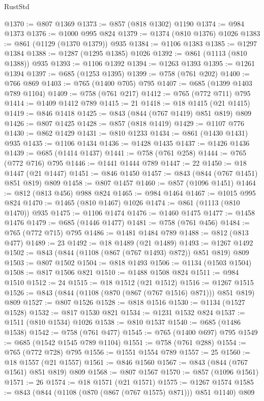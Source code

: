 \begin{lexlean}{RustStd}
\begin{coremodule}
@1370 := @807 @1369
@1373 := @857 (@818 @1302) @1190
@1374 := @984 @1373
@1376 := @1000 @995 @824
@1379 := @1374 (@810 @1376) @1026
@1383 := @861 (@1129 (@1370 @1379)) @935
@1384 := @1106 @1383
@1385 := @1297 @1384
@1388 := @1287 (@1295 @1385) @1026
@1392 := @861 (@1113 (@810 @1388)) @935
@1393 := @1106 @1392
@1394 := @1263 @1393
@1395 := @1261 @1394
@1397 := @685 (@1253 @1395)
@1399 := @758 (@761 @202)
@1400 := @766 @869
@1403 := @765 (@1400 @705) @795
@1407 := @685 (@1399 @1403 @789 @1104)
@1409 := @758 (@761 @217)
@1412 := @765 (@772 @711) @795
@1414 := @1409 @1412 @789
@1415 := 21
@1418 := @18 @1415 (@21 @1415)
@1419 := @846 @1418
@1425 := @843 (@844 (@767 @1419) @851 @819) @809
@1426 := @807 @1425
@1428 := @857 (@818 @1419)
@1429 := @1107 @776
@1430 := @862 @1429
@1431 := @810 @1233
@1434 := @861 (@1430 @1431) @935
@1435 := @1106 @1434
@1436 := @1428 @1435
@1437 := @1426 @1436
@1439 := @685 (@1414 @1437)
@1441 := @758 (@761 @258)
@1444 := @765 (@772 @716) @795
@1446 := @1441 @1444 @789
@1447 := 22
@1450 := @18 @1447 (@21 @1447)
@1451 := @846 @1450
@1457 := @843 (@844 (@767 @1451) @851 @819) @809
@1458 := @807 @1457
@1460 := @857 (@1096 @1451)
@1464 := @812 (@813 @456) @988 @824
@1465 := @984 @1464
@1467 := @1015 @995 @824
@1470 := @1465 (@810 @1467) @1026
@1474 := @861 (@1113 (@810 @1470)) @935
@1475 := @1106 @1474
@1476 := @1460 @1475
@1477 := @1458 @1476
@1479 := @685 (@1446 @1477)
@1481 := @758 (@761 @456)
@1484 := @765 (@772 @715) @795
@1486 := @1481 @1484 @789
@1488 := @812 (@813 @477)
@1489 := 23
@1492 := @18 @1489 (@21 @1489)
@1493 := @1267 @1492
@1502 := @843 (@844 (@1108 (@867 (@767 @1493) @872)) @851 @819) @809
@1503 := @807 @1502
@1504 := @818 @1493
@1506 := @1134 (@1503 @1504)
@1508 := @817 @1506 @821
@1510 := @1488 @1508 @824
@1511 := @984 @1510
@1512 := 24
@1515 := @18 @1512 (@21 @1512)
@1516 := @1267 @1515
@1526 := @843 (@844 (@1108 (@870 (@867 (@767 @1516) @871))) @851 @819) @809
@1527 := @807 @1526
@1528 := @818 @1516
@1530 := @1134 (@1527 @1528)
@1532 := @817 @1530 @821
@1534 := @1231 @1532 @824
@1537 := @1511 (@810 @1534) @1026
@1538 := @810 @1537
@1540 := @685 (@1486 @1538)
@1542 := @758 (@761 @477)
@1545 := @765 (@1400 @697) @795
@1549 := @685 (@1542 @1545 @789 @1104)
@1551 := @758 (@761 @288)
@1554 := @765 (@772 @728) @795
@1556 := @1551 @1554 @789
@1557 := 25
@1560 := @18 @1557 (@21 @1557)
@1561 := @846 @1560
@1567 := @843 (@844 (@767 @1561) @851 @819) @809
@1568 := @807 @1567
@1570 := @857 (@1096 @1561)
@1571 := 26
@1574 := @18 @1571 (@21 @1571)
@1575 := @1267 @1574
@1585 := @843 (@844 (@1108 (@870 (@867 (@767 @1575) @871))) @851 @1140) @809

\end{coremodule}
\end{lexlean}
